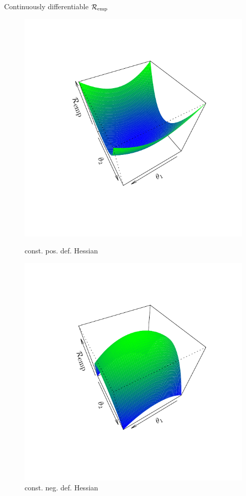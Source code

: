 \documentclass[11pt,compress,t,notes=noshow, xcolor=table]{beamer}
\begin{document}
\begin{vbframe}{Continuously differentiable $\mathcal{R}_{\text{emp}}$}
\begin{figure}[!htb]
  \includegraphics[trim=2.2cm 2.2cm 2.2cm 2.2cm, width=\linewidth]{figure/hess1}
  \caption*{\footnotesize const. pos. def. Hessian}
\endminipage\hfill
{}%
  \includegraphics[trim=2.2cm 2.2cm 2.2cm 2.2cm, width=\linewidth]{figure/hess2}
  \caption*{\footnotesize const. neg. def. Hessian}
\endminipage
\end{figure}

\end{vbframe}
\end{document}
